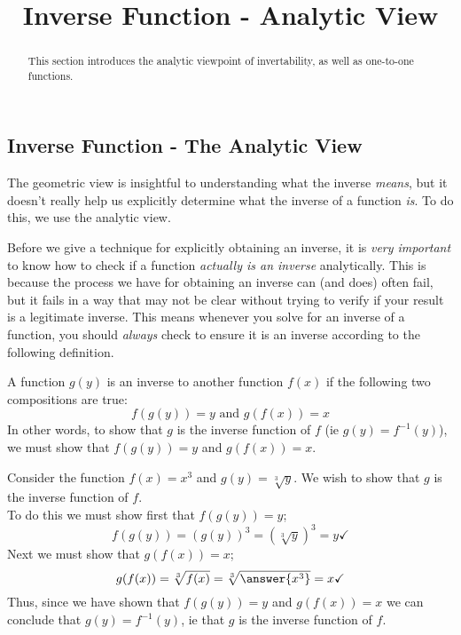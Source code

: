 \documentclass{ximera}
\title{Inverse Function - Analytic View}
\begin{document}
\begin{abstract}
    This section introduces the analytic viewpoint of invertability, as well as one-to-one functions.
\end{abstract}
\maketitle

\subsection*{Inverse Function - The Analytic View}

    The geometric view is insightful to understanding what the inverse \textit{means}, but it doesn't really help us explicitly determine what the inverse of a function \textit{is}. To do this, we use the analytic view.
    
    Before we give a technique for explicitly obtaining an inverse, it is \textit{very important} to know how to check if a function \textit{actually is an inverse} analytically. This is because the process we have for obtaining an inverse can (and does) often fail, but it fails in a way that may not be clear without trying to verify if your result is a legitimate inverse. This means whenever you solve for an inverse of a function, you should \textit{always} check to ensure it is an inverse according to the following definition.
    
    \begin{definition}
        A function $g(y)$ is an inverse to another function $f(x)$ if the following two compositions are true:
        \[
            f(g(y)) = y \text{ and } g(f(x)) = x
        \]
        In other words, to show that $g$ is the inverse function of $f$ (ie $g(y) = f^{-1}(y)$), we must show that $f(g(y)) = y$ and $g(f(x)) = x$.
    \end{definition}
    
    \begin{example}
        Consider the function $f(x) = x^3$ and $g(y) = \sqrt[3]{y}$. We wish to show that $g$ is the inverse function of $f$.\\
        
        To do this we must show first that $f(g(y)) = y$;
        \[
            f(g(y)) = (g(y))^3 = (\sqrt[3]{y})^3 = y  \checkmark
        \]
        Next we must show that $g(f(x)) = x$;
        \[
            g(f(x)) = \sqrt[3]{f(x)} = \sqrt[3]{\answer{x^3}} = x  \checkmark
        \]
        Thus, since we have shown that $f(g(y)) = y$ and $g(f(x)) = x$ we can conclude that $g(y) = f^{-1}(y)$, ie that $g$ is the inverse function of $f$.
    \end{example}
    
\end{document}
